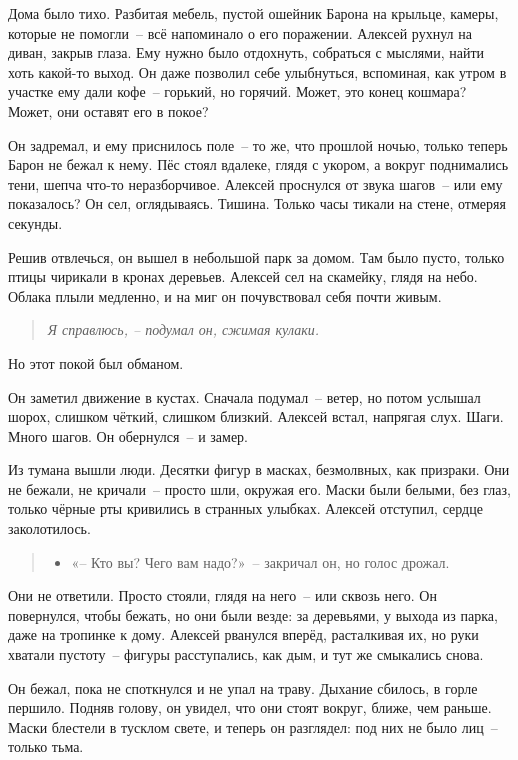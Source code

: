\documentclass[12pt,a4paper]{book}
\newenvironment{dialogue}{\begin{quote}\itshape\begin{itemize}\item[]}{\end{itemize}\end{quote}}
\newenvironment{innerthought}{\begin{quote}\small\itshape}{\end{quote}}
\begin{document}
Дома было тихо. Разбитая мебель, пустой ошейник Барона на крыльце, камеры, которые не помогли~-- всё напоминало о его поражении. Алексей рухнул на диван, закрыв глаза. Ему нужно было отдохнуть, собраться с мыслями, найти хоть какой-то выход. Он даже позволил себе улыбнуться, вспоминая, как утром в участке ему дали кофе~-- горький, но горячий. Может, это конец кошмара? Может, они оставят его в покое?

Он задремал, и ему приснилось поле~-- то же, что прошлой ночью, только теперь Барон не бежал к нему. Пёс стоял вдалеке, глядя с укором, а вокруг поднимались тени, шепча что-то неразборчивое. Алексей проснулся от звука шагов~-- или ему показалось? Он сел, оглядываясь. Тишина. Только часы тикали на стене, отмеряя секунды.

Решив отвлечься, он вышел в небольшой парк за домом. Там было пусто, только птицы чирикали в кронах деревьев. Алексей сел на скамейку, глядя на небо. Облака плыли медленно, и на миг он почувствовал себя почти живым. 
\begin{innerthought}
    Я справлюсь, -- подумал он, сжимая кулаки.
\end{innerthought}

Но этот покой был обманом.

Он заметил движение в кустах. Сначала подумал~-- ветер, но потом услышал шорох, слишком чёткий, слишком близкий. Алексей встал, напрягая слух. Шаги. Много шагов. Он обернулся~-- и замер.

Из тумана вышли люди. Десятки фигур в масках, безмолвных, как призраки. Они не бежали, не кричали~-- просто шли, окружая его. Маски были белыми, без глаз, только чёрные рты кривились в странных улыбках. Алексей отступил, сердце заколотилось.

\begin{dialogue}
«-- Кто вы? Чего вам надо?»~-- закричал он, но голос дрожал.
\end{dialogue}

Они не ответили. Просто стояли, глядя на него~-- или сквозь него. Он повернулся, чтобы бежать, но они были везде: за деревьями, у выхода из парка, даже на тропинке к дому. Алексей рванулся вперёд, расталкивая их, но руки хватали пустоту~-- фигуры расступались, как дым, и тут же смыкались снова.

Он бежал, пока не споткнулся и не упал на траву. Дыхание сбилось, в горле першило. Подняв голову, он увидел, что они стоят вокруг, ближе, чем раньше. Маски блестели в тусклом свете, и теперь он разглядел: под них не было лиц~-- только тьма.
\end{document}
